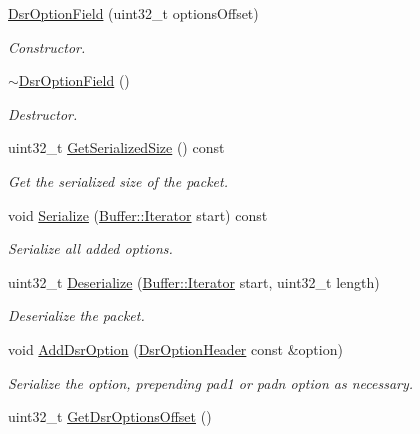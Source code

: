 \begin{DoxyCompactItemize}
\item 
\hyperlink{classns3_1_1dsr_1_1DsrOptionField_aea9d8a4fc4a9fda8590bc88f19728ecc}{Dsr\+Option\+Field} (uint32\+\_\+t options\+Offset)
\begin{DoxyCompactList}\small\item\em Constructor. \end{DoxyCompactList}\item 
\hyperlink{classns3_1_1dsr_1_1DsrOptionField_af0e433254747672f4513b719ab3fd93b}{$\sim$\+Dsr\+Option\+Field} ()
\begin{DoxyCompactList}\small\item\em Destructor. \end{DoxyCompactList}\item 
uint32\+\_\+t \hyperlink{classns3_1_1dsr_1_1DsrOptionField_aae94bdbff441fb8dafa9d20efe21b949}{Get\+Serialized\+Size} () const 
\begin{DoxyCompactList}\small\item\em Get the serialized size of the packet. \end{DoxyCompactList}\item 
void \hyperlink{classns3_1_1dsr_1_1DsrOptionField_a86d85db49c9330a24cd79a024e08218e}{Serialize} (\hyperlink{classns3_1_1Buffer_1_1Iterator}{Buffer\+::\+Iterator} start) const 
\begin{DoxyCompactList}\small\item\em Serialize all added options. \end{DoxyCompactList}\item 
uint32\+\_\+t \hyperlink{classns3_1_1dsr_1_1DsrOptionField_a18a58a88b2ba6ffc94669771647e586c}{Deserialize} (\hyperlink{classns3_1_1Buffer_1_1Iterator}{Buffer\+::\+Iterator} start, uint32\+\_\+t length)
\begin{DoxyCompactList}\small\item\em Deserialize the packet. \end{DoxyCompactList}\item 
void \hyperlink{classns3_1_1dsr_1_1DsrOptionField_acd03d07018e22f5e2b23975fae84fb3c}{Add\+Dsr\+Option} (\hyperlink{classns3_1_1dsr_1_1DsrOptionHeader}{Dsr\+Option\+Header} const \&option)
\begin{DoxyCompactList}\small\item\em Serialize the option, prepending pad1 or padn option as necessary. \end{DoxyCompactList}\item 
uint32\+\_\+t \hyperlink{classns3_1_1dsr_1_1DsrOptionField_a38af1f50ae6f4e7a4a4cf6afd99c5a74}{Get\+Dsr\+Options\+Offset} ()

\end{DoxyCompactItemize}
